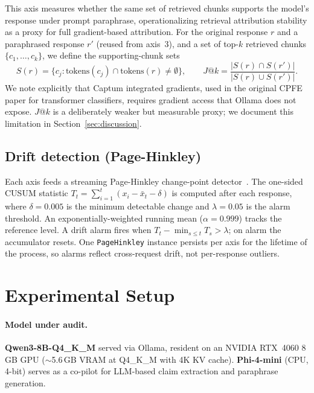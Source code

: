 \documentclass{article}
\begin{document}
This axis measures whether the same set of retrieved chunks supports the
model's response under prompt paraphrase, operationalizing retrieval
attribution stability as a proxy for full gradient-based attribution.
For the original response $r$ and a paraphrased response $r'$ (reused
from axis~3), and a set of top-$k$ retrieved chunks
$\{c_1, \ldots, c_k\}$, we define the supporting-chunk sets
\[
  S(r) = \{c_j : \text{tokens}(c_j) \cap \text{tokens}(r) \neq \emptyset \},
  \qquad
  J@k = \frac{|S(r) \cap S(r')|}{|S(r) \cup S(r')|}.
\]
We note explicitly that Captum integrated gradients, used in the original
CPFE paper for transformer classifiers, requires gradient access that
Ollama does not expose.
$J@k$ is a deliberately weaker but measurable proxy; we document this
limitation in Section~\ref{sec:discussion}.

\subsection{Drift detection (Page-Hinkley)}
\label{sec:drift}

Each axis feeds a streaming Page-Hinkley change-point
detector~\citep{page1954continuous}.
The one-sided CUSUM statistic
$T_t = \sum_{i=1}^{t}(x_i - \bar{x}_t - \delta)$
is computed after each response, where $\delta = 0.005$ is the minimum
detectable change and $\lambda = 0.05$ is the alarm threshold.
An exponentially-weighted running mean ($\alpha = 0.999$) tracks the
reference level.
A drift alarm fires when $T_t - \min_{s \le t} T_s > \lambda$; on alarm
the accumulator resets.
One \texttt{PageHinkley} instance persists per axis for the lifetime of
the process, so alarms reflect cross-request drift, not per-response
outliers.

\section{Experimental Setup}
\label{sec:setup}

\paragraph{Model under audit.}
\textbf{Qwen3-8B-Q4\_K\_M} served via Ollama, resident on an NVIDIA
RTX~4060 8\,GB GPU ($\sim$5.6\,GB VRAM at Q4\_K\_M with 4K KV cache).
\textbf{Phi-4-mini} (CPU, 4-bit) serves as a co-pilot for LLM-based claim
extraction and paraphrase generation.
\end{document}
